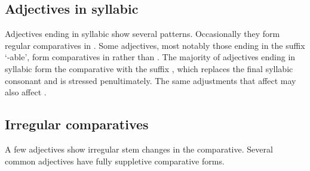 \subsection{Adjectives in syllabic }
Adjectives ending in syllabic  show several patterns. Occasionally they form regular comparatives in .
Some adjectives, most notably those ending in the suffix  `-able', form comparatives in  rather than .
The majority of adjectives ending in syllabic  form the comparative with the suffix , which replaces the final syllabic consonant and is stressed penultimately. The same adjustments that affect  may also affect .

\subsection{Irregular comparatives}
A few adjectives show irregular stem changes in the comparative.
Several common adjectives have fully suppletive comparative forms.


